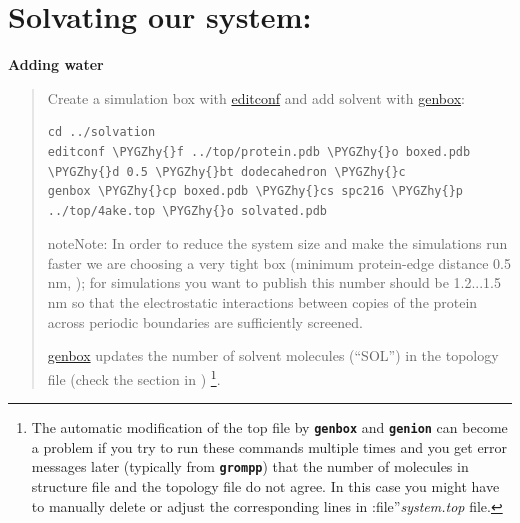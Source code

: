 \documentclass[letterpaper,10pt,english]{sphinxmanual}
\def\PYGZhy{\char`\-}
\begin{document}
\section{Solvating our system:}
\label{system_setup:solvating-our-system}
\textbf{Adding water}
\begin{quote}

Create a simulation box with \href{http://manual.gromacs.org/current/online/editconf.html}{editconf} and add solvent with \href{http://manual.gromacs.org/current/online/genbox.html}{genbox}:

\begin{Verbatim}[commandchars=\\\{\}]
cd ../solvation
editconf \PYGZhy{}f ../top/protein.pdb \PYGZhy{}o boxed.pdb \PYGZhy{}d 0.5 \PYGZhy{}bt dodecahedron \PYGZhy{}c
genbox \PYGZhy{}cp boxed.pdb \PYGZhy{}cs spc216 \PYGZhy{}p ../top/4ake.top \PYGZhy{}o solvated.pdb
\end{Verbatim}

\begin{notice}{note}{Note:}
In order to reduce the system size and make the simulations run
faster we are choosing a very tight box (minimum protein-edge
distance 0.5 nm, ); for simulations you want to publish
this number should be 1.2...1.5 nm so that the electrostatic
interactions between copies of the protein across periodic
boundaries are sufficiently screened.
\end{notice}

\href{http://manual.gromacs.org/current/online/genbox.html}{genbox} updates the number of solvent molecules (``SOL'') in the
topology file (check the \code{{[} system {]}} section in
) \footnote{
The automatic modification of the top file by
\textbf{\texttt{genbox}} and \textbf{\texttt{genion}} can become a problem if you
try to run these commands multiple times and you get error messages
later (typically from \textbf{\texttt{grompp}}) that the number of
molecules in structure file and the topology file do not agree. In
this case you might have to manually delete or adjust the
corresponding lines in :file''\emph{system.top} file.
}.
\end{quote}
\end{document}
